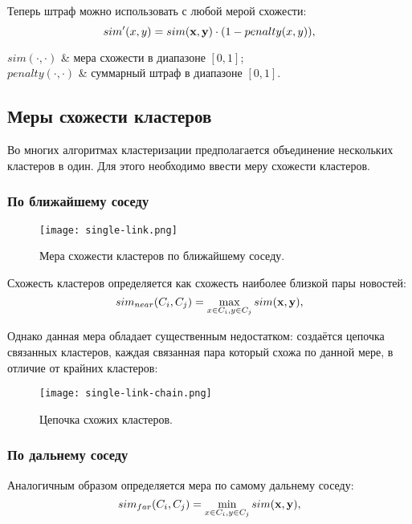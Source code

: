 Теперь штраф можно использовать с любой мерой схожести:
\begin{equation}
    sim'(x,y)=sim(\boldsymbol{\mathbf{x}},\boldsymbol{\mathbf{y}})\cdot(1-penalty(x,y)),
\end{equation}
\begin{conditions}
    $sim(\cdot,\cdot)$ & мера схожести в диапазоне $[0,1]$; \\
    $penalty(\cdot,\cdot)$ & суммарный штраф в диапазоне $[0,1]$. \\
\end{conditions}

\subsection{Меры схожести кластеров}
Во многих алгоритмах кластеризации предполагается объединение нескольких кластеров в один. Для этого необходимо ввести меру схожести кластеров.

\subsubsection{По ближайшему соседу}
\begin{figure}[h]
    \centering
    \texttt{[image: single-link.png]}
    \caption{Мера схожести кластеров по ближайшему соседу.}
\end{figure}

Схожесть кластеров определяется как схожесть наиболее близкой пары новостей:
\begin{equation}
    sim_{near}(C_i,C_j)=\max_{x\in C_i,y\in C_j}sim(\boldsymbol{\mathbf{x}},\boldsymbol{\mathbf{y}}),
\end{equation}

Однако данная мера обладает существенным недостатком: создаётся цепочка связанных кластеров, каждая связанная пара который схожа по данной мере, в отличие от крайних кластеров:
\begin{figure}[h]
    \centering
    \texttt{[image: single-link-chain.png]}
    \caption{Цепочка схожих кластеров.}
\end{figure}

\subsubsection{По дальнему соседу}
Аналогичным образом определяется мера по самому дальнему соседу:
\begin{equation}
    sim_{far}(C_i,C_j)=\min_{x\in C_i,y\in C_j}sim(\boldsymbol{\mathbf{x}},\boldsymbol{\mathbf{y}}),
\end{equation}

